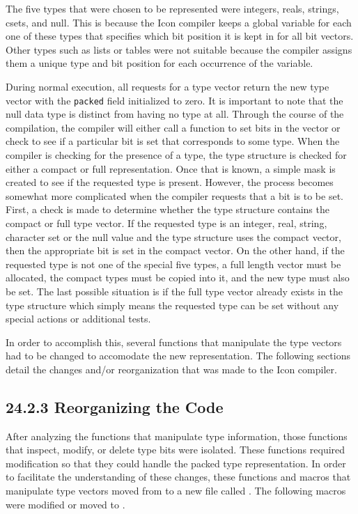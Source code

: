 The five types that were chosen to be represented were integers,
reals, strings, csets, and null. This is because the Icon compiler
keeps a global variable for each one of these types that specifies
which bit position it is kept in for all bit vectors. Other types such
as lists or tables were not suitable because the compiler assigns them
a unique type and bit position for each occurrence of the variable.

During normal execution, all requests for a type vector return the new
type vector with the \texttt{packed} field initialized to zero. It
is important to note that the null data type is distinct from having
no type at all. Through the course of the compilation, the compiler
will either call a function to set bits in the vector or check to see
if a particular bit is set that corresponds to some type. When the
compiler is checking for the presence of a type, the type structure is
checked for either a compact or full representation. Once that is
known, a simple mask is created to see if the requested type is
present. However, the process becomes somewhat more complicated when
the compiler requests that a bit is to be set. First, a check is
made to determine whether the type structure contains the compact or
full type vector. If the requested type is an integer, real, string,
character set or the null value and the type structure uses the
compact vector, then the appropriate bit is set in the compact
vector. On the other hand, if the requested type is not one of the
special five types, a full length vector must be allocated, the
compact types must be copied into it, and the new type must also be
set. The last possible situation is if the full type vector already
exists in the type structure which simply means the requested type can
be set without any special actions or additional tests.

In order to accomplish this, several functions that manipulate the
type vectors had to be changed to accomodate the new representation.
The following sections detail the changes and/or reorganization that
was made to the Icon compiler.

\subsection[24.2.3 Reorganizing the Code]{24.2.3 Reorganizing the Code}

After analyzing the functions that manipulate type information, those
functions that inspect, modify, or delete type bits were
isolated. These functions required modification so that they could
handle the packed type representation. In order to facilitate the
understanding of these changes, these functions and macros that
manipulate type vectors moved from  to a new file
called . The following macros were modified or moved
to .

